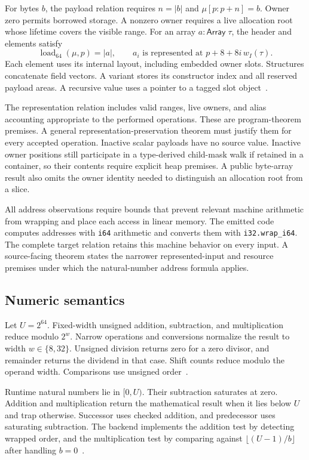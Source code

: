 \documentclass[11pt]{article}
\newcommand{\code}[1]{\texttt{#1}}
\newcommand{\ty}[1]{\mathsf{#1}}
\begin{document}
For bytes $b$, the payload relation requires $n=|b|$ and $\mu[p:p+n]=b$.  Owner zero permits borrowed storage.  A nonzero owner requires a live allocation root whose lifetime covers the visible range.  For an array $a:\ty{Array}\;\tau$, the header and elements satisfy
\[
\operatorname{load}_{64}(\mu,p)=|a|,
\qquad
a_i\text{ is represented at }p+8+8i\,w_I(\tau).
\]
Each element uses its internal layout, including embedded owner slots.  Structures concatenate field vectors.  A variant stores its constructor index and all reserved payload areas.  A recursive value uses a pointer to a tagged slot object~\cite{storage,values,binary}.

The representation relation includes valid ranges, live owners, and alias accounting appropriate to the performed operations.  These are program-theorem premises.  A general representation-preservation theorem must justify them for every accepted operation.  Inactive scalar payloads have no source value.  Inactive owner positions still participate in a type-derived child-mask walk if retained in a container, so their contents require explicit heap premises.  A public byte-array result also omits the owner identity needed to distinguish an allocation root from a slice.

All address observations require bounds that prevent relevant machine arithmetic from wrapping and place each access in linear memory.  The emitted code computes addresses with \code{i64} arithmetic and converts them with \code{i32.wrap\_i64}.  The complete target relation retains this machine behavior on every input.  A source-facing theorem states the narrower represented-input and resource premises under which the natural-number address formula applies.

\subsection{Numeric semantics}

Let $U=2^{64}$.  Fixed-width unsigned addition, subtraction, and multiplication reduce modulo $2^w$.  Narrow operations and conversions normalize the result to width $w\in\{8,32\}$.  Unsigned division returns zero for a zero divisor, and remainder returns the dividend in that case.  Shift counts reduce modulo the operand width.  Comparisons use unsigned order~\cite{extract,binary}.

Runtime natural numbers lie in $[0,U)$.  Their subtraction saturates at zero.  Addition and multiplication return the mathematical result when it lies below $U$ and trap otherwise.  Successor uses checked addition, and predecessor uses saturating subtraction.  The backend implements the addition test by detecting wrapped order, and the multiplication test by comparing against $\lfloor(U-1)/b\rfloor$ after handling $b=0$~\cite{binary}.
\end{document}

